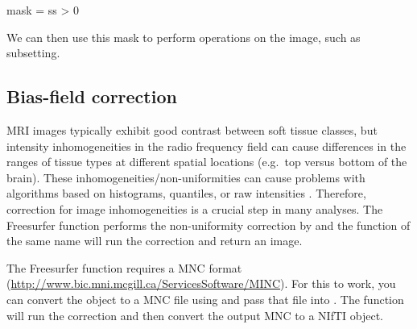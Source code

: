 \begin{Schunk}
\begin{Sinput}
mask = ss > 0
\end{Sinput}
\end{Schunk}

We can then use this mask to perform operations on the image, such as
subsetting.

\subsection{Bias-field correction}

MRI images typically exhibit good contrast between soft tissue classes,
but intensity inhomogeneities in the radio frequency field can cause
differences in the ranges of tissue types at different spatial locations
(e.g.~top versus bottom of the brain). These
inhomogeneities/non-uniformities can cause problems with algorithms
based on histograms, quantiles, or raw intensities
\citep{zhang_segmentation_2001}. Therefore, correction for image
inhomogeneities is a crucial step in many analyses. The Freesurfer
function  performs the non-uniformity correction by
\citet{sled_nonparametric_1998} and the  function of the
same name will run the correction and return an image.

The Freesurfer  function requires a MNC format
(\url{http://www.bic.mni.mcgill.ca/ServicesSoftware/MINC}). For this to
work, you can convert the  object to a MNC file using
 and pass that file into . The
  function will run the correction and
then convert the output MNC to a NIfTI object.

